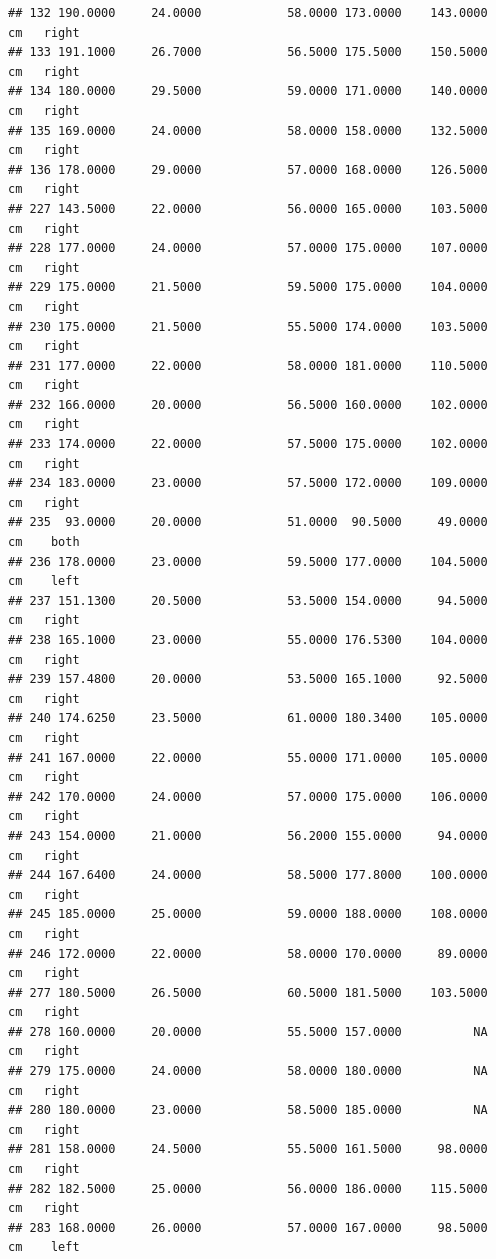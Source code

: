 \documentclass[]{article}
\begin{document}
\begin{verbatim}
## 132 190.0000     24.0000            58.0000 173.0000    143.0000     cm   right
## 133 191.1000     26.7000            56.5000 175.5000    150.5000     cm   right
## 134 180.0000     29.5000            59.0000 171.0000    140.0000     cm   right
## 135 169.0000     24.0000            58.0000 158.0000    132.5000     cm   right
## 136 178.0000     29.0000            57.0000 168.0000    126.5000     cm   right
## 227 143.5000     22.0000            56.0000 165.0000    103.5000     cm   right
## 228 177.0000     24.0000            57.0000 175.0000    107.0000     cm   right
## 229 175.0000     21.5000            59.5000 175.0000    104.0000     cm   right
## 230 175.0000     21.5000            55.5000 174.0000    103.5000     cm   right
## 231 177.0000     22.0000            58.0000 181.0000    110.5000     cm   right
## 232 166.0000     20.0000            56.5000 160.0000    102.0000     cm   right
## 233 174.0000     22.0000            57.5000 175.0000    102.0000     cm   right
## 234 183.0000     23.0000            57.5000 172.0000    109.0000     cm   right
## 235  93.0000     20.0000            51.0000  90.5000     49.0000     cm    both
## 236 178.0000     23.0000            59.5000 177.0000    104.5000     cm    left
## 237 151.1300     20.5000            53.5000 154.0000     94.5000     cm   right
## 238 165.1000     23.0000            55.0000 176.5300    104.0000     cm   right
## 239 157.4800     20.0000            53.5000 165.1000     92.5000     cm   right
## 240 174.6250     23.5000            61.0000 180.3400    105.0000     cm   right
## 241 167.0000     22.0000            55.0000 171.0000    105.0000     cm   right
## 242 170.0000     24.0000            57.0000 175.0000    106.0000     cm   right
## 243 154.0000     21.0000            56.2000 155.0000     94.0000     cm   right
## 244 167.6400     24.0000            58.5000 177.8000    100.0000     cm   right
## 245 185.0000     25.0000            59.0000 188.0000    108.0000     cm   right
## 246 172.0000     22.0000            58.0000 170.0000     89.0000     cm   right
## 277 180.5000     26.5000            60.5000 181.5000    103.5000     cm   right
## 278 160.0000     20.0000            55.5000 157.0000          NA     cm   right
## 279 175.0000     24.0000            58.0000 180.0000          NA     cm   right
## 280 180.0000     23.0000            58.5000 185.0000          NA     cm   right
## 281 158.0000     24.5000            55.5000 161.5000     98.0000     cm   right
## 282 182.5000     25.0000            56.0000 186.0000    115.5000     cm   right
## 283 168.0000     26.0000            57.0000 167.0000     98.5000     cm    left

\end{verbatim}
\end{document}
